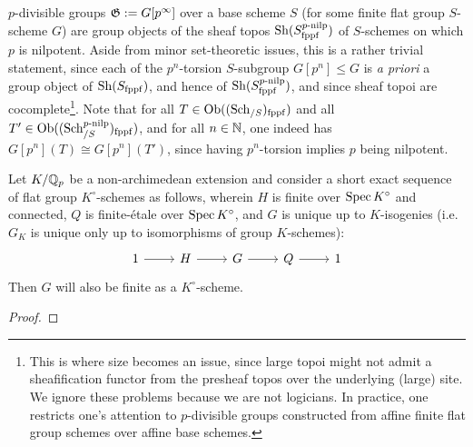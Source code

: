             \begin{remark}
                $p$-divisible groups $\mathfrak{G} := G[p^{\infty}]$ over a base scheme $S$ (for some finite flat group $S$-scheme $G$) are group objects of the sheaf topos $\mathrm{Sh}(S_{\mathrm{fppf}}^{p\text{-}\mathrm{nilp}})$ of $S$-schemes on which $p$ is nilpotent. Aside from minor set-theoretic issues, this is a rather trivial statement, since each of the $p^n$-torsion $S$-subgroup $G[p^n] \leq G$ is \textit{a priori} a group object of $\mathrm{Sh}(S_{\mathrm{fppf}})$, and hence of $\mathrm{Sh}(S_{\mathrm{fppf}}^{p\text{-}\mathrm{nilp}})$, and since sheaf topoi are cocomplete\footnote{This is where size becomes an issue, since large topoi might not admit a sheafification functor from the presheaf topos over the underlying (large) site. We ignore these problems because we are not logicians. In practice, one restricts one's attention to $p$-divisible groups constructed from affine finite flat group schemes over affine base schemes.}. Note that for all $T \in \mathrm{Ob}((\mathrm{Sch}_{/S})_{\mathrm{fppf}})$ and all $T' \in \mathrm{Ob}((\mathrm{Sch}_{/S}^{p\text{-}\mathrm{nilp}})_{\mathrm{fppf}})$, and for all $n \in \mathbb{N}$, one indeed has $G[p^n](T) \cong G[p^n](T')$, since having $p^n$-torsion implies $p$ being nilpotent.
            \end{remark}
            \begin{lemma} \label{lemma: extensions_of_etale_finite_flat_groups_by_connected_finite_flat_groups}
                Let $K/\mathbb{Q}_p$ be a non-archimedean extension and consider a short exact sequence of flat group $K^{\circ}$-schemes as follows, wherein $H$ is finite over $\operatorname{Spec} K^{\circ}$ and connected, $Q$ is finite-\'etale over $\operatorname{Spec} K^{\circ}$, and $G$ is unique up to $K$-isogenies (i.e. $G_K$ is unique only up to isomorphisms of group $K$-schemes):
                    $$
                        \begin{tikzcd}
                        	1 & H & G & Q & 1
                        	\arrow[from=1-1, to=1-2]
                        	\arrow[from=1-2, to=1-3]
                        	\arrow[from=1-3, to=1-4]
                        	\arrow[from=1-4, to=1-5]
                        \end{tikzcd}
                    $$
                Then $G$ will also be finite as a $K^{\circ}$-scheme.
            \end{lemma}
                \begin{proof}
                        
                \end{proof}
